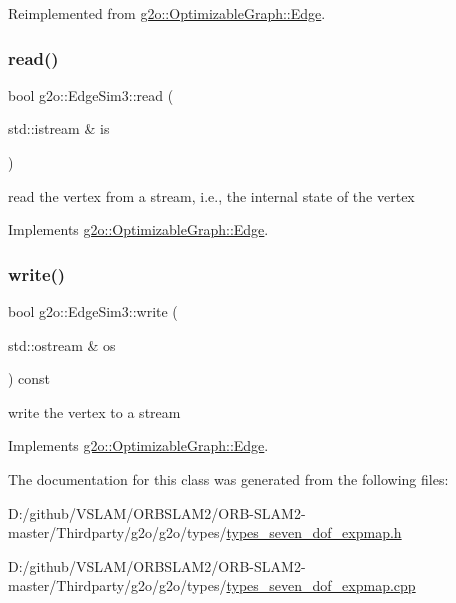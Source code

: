 Reimplemented from \mbox{\hyperlink{classg2o_1_1_optimizable_graph_1_1_edge_a1cef6ffa0f82f1ad3dd3d7a9f04425ee}{g2o\+::\+Optimizable\+Graph\+::\+Edge}}.

\mbox{\label{classg2o_1_1_edge_sim3_a6c7ad669fa04265475cbfdba3452fcbd}} 
\subsubsection{\texorpdfstring{read()}{read()}}
{\footnotesize\ttfamily bool g2o\+::\+Edge\+Sim3\+::read (\begin{DoxyParamCaption}\item[{std\+::istream \&}]{is }\end{DoxyParamCaption})\hspace{0.3cm}{\ttfamily [virtual]}}



read the vertex from a stream, i.\+e., the internal state of the vertex 



Implements \mbox{\hyperlink{classg2o_1_1_optimizable_graph_1_1_edge_a30cf69b762a06aa35e796d8af71632b0}{g2o\+::\+Optimizable\+Graph\+::\+Edge}}.

\mbox{\label{classg2o_1_1_edge_sim3_ae1f72205352bf73156b70080ecfa235b}} 
\subsubsection{\texorpdfstring{write()}{write()}}
{\footnotesize\ttfamily bool g2o\+::\+Edge\+Sim3\+::write (\begin{DoxyParamCaption}\item[{std\+::ostream \&}]{os }\end{DoxyParamCaption}) const\hspace{0.3cm}{\ttfamily [virtual]}}



write the vertex to a stream 



Implements \mbox{\hyperlink{classg2o_1_1_optimizable_graph_1_1_edge_a804b9a2178249b9297c55b8fbbeda56e}{g2o\+::\+Optimizable\+Graph\+::\+Edge}}.



The documentation for this class was generated from the following files\+:\begin{DoxyCompactItemize}
\item 
D\+:/github/\+V\+S\+L\+A\+M/\+O\+R\+B\+S\+L\+A\+M2/\+O\+R\+B-\/\+S\+L\+A\+M2-\/master/\+Thirdparty/g2o/g2o/types/\mbox{\hyperlink{types__seven__dof__expmap_8h}{types\+\_\+seven\+\_\+dof\+\_\+expmap.\+h}}\item 
D\+:/github/\+V\+S\+L\+A\+M/\+O\+R\+B\+S\+L\+A\+M2/\+O\+R\+B-\/\+S\+L\+A\+M2-\/master/\+Thirdparty/g2o/g2o/types/\mbox{\hyperlink{types__seven__dof__expmap_8cpp}{types\+\_\+seven\+\_\+dof\+\_\+expmap.\+cpp}}\end{DoxyCompactItemize}
